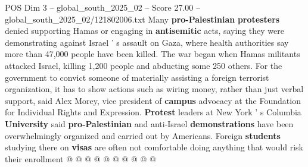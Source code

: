 \begin{textsample}{POS Dim 3 – global\_south\_2025\_02 – Score 27.00 – global\_south\_2025\_02/121802006.txt}
Many \textbf{pro-Palestinian} \textbf{protesters} denied supporting Hamas or engaging in \textbf{antisemitic} acts, saying they were demonstrating against Israel ' s assault on Gaza, where health authorities say more than 47,000 people have been killed.
The war began when Hamas militants attacked Israel, killing 1,200 people and abducting some 250 others.
For the government to convict someone of materially assisting a foreign terrorist organization, it has to show actions such as wiring money, rather than just verbal support, said Alex Morey, vice president of \textbf{campus} advocacy at the Foundation for Individual Rights and Expression. \textbf{Protest} leaders at New York ' s Columbia \textbf{University} said \textbf{pro-Palestinian} and anti-Israel \textbf{demonstrations} have been overwhelmingly organized and carried out by Americans.
Foreign \textbf{students} studying there on \textbf{visas} are often not comfortable doing anything that would risk their enrollment @ @ @ @ @ @ @ @ @ @

\end{textsample}

